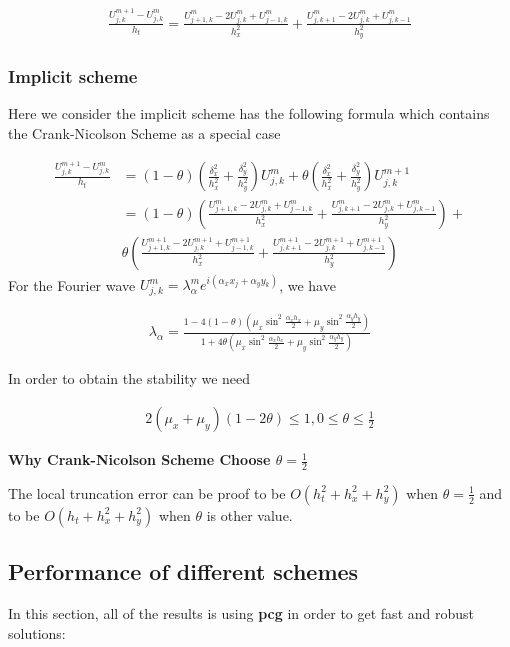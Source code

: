 \documentclass[12pt]{amsart}
\begin{document}
\begin{align*}
\frac{U_{j,k}^{m+1}-U_{j,k}^{m}}{h_t}=\frac{U_{j+1,k}^m-2U_{j,k}^m+U_{j-1,k}^m}{h_x^2} + \frac{U_{j,k+1}^m-2U_{j,k}^m+U_{j,k-1}^m}{h_y^2}
\end{align*}

\subsubsection{Implicit scheme} Here we consider the implicit scheme has the following formula which contains the Crank-Nicolson Scheme as a special case

\begin{align*}
\frac{U_{j,k}^{m+1}-U_{j,k}^{m}}{h_t}&=
(1-\theta)(\frac{\delta_x^2}{h_x^2}+\frac{\delta_y^2}{h_y^2})U_{j,k}^m+\theta(\frac{\delta_x^2}{h_x^2}+\frac{\delta_y^2}{h_y^2})U_{j,k}^{m+1}\\
&=
(1-\theta)(\frac{U_{j+1,k}^m-2U_{j,k}^m+U_{j-1,k}^m}{h_x^2} + \frac{U_{j,k+1}^m-2U_{j,k}^m+U_{j,k-1}^m}{h_y^2})+\\
&\theta (\frac{U_{j+1,k}^{m+1}-2U_{j,k}^{m+1}+U_{j-1,k}^{m+1}}{h_x^2} + \frac{U_{j,k+1}^{m+1}-2U_{j,k}^{m+1}+U_{j,k-1}^{m+1}}{h_y^2})
\end{align*}
For the Fourier wave $U_{j,k}^m=\lambda_\alpha^me^{i(\alpha_xx_j+\alpha_yy_k)}$,  we have

\begin{align*}
\lambda_\alpha=\frac{1-4(1-\theta)(\mu_x\sin^2\frac{\alpha_xh_x}{2}+\mu_y\sin^2\frac{\alpha_yh_y}{2})}{1+4\theta(\mu_x\sin^2\frac{\alpha_xh_x}{2}+\mu_y\sin^2\frac{\alpha_yh_y}{2})}
\end{align*}

In order to obtain the stability we need

\begin{align*}
2(\mu_x+\mu_y)(1-2\theta)\le 1, 0\le \theta\le \frac{1}{2}
\end{align*}

\textbf{Why Crank-Nicolson Scheme Choose $\theta=\frac{1}{2}$}

The local truncation error can be proof to be $O(h_t^2+h_x^2+h_y^2)$ when  $\theta=\frac{1}{2}$ and to be $O(h_t+h_x^2+h_y^2)$ when $\theta$ is other value.



\subsection{Performance of different schemes}  
In this section, all of the results is using \textbf{pcg} in order to get fast and robust solutions:
\end{document}
